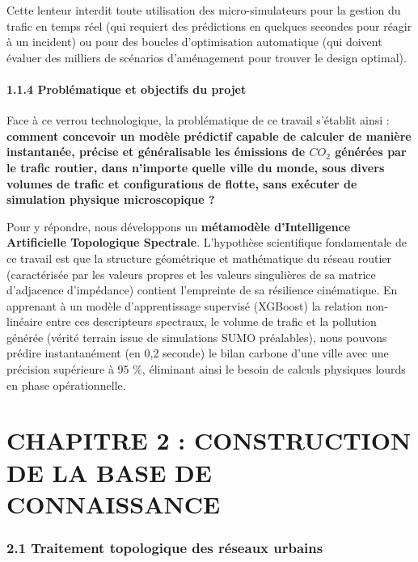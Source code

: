 \documentclass[10pt, a4paper]{article}
\begin{document}
Cette lenteur interdit toute utilisation des micro-simulateurs pour la
gestion du trafic en temps réel (qui requiert des prédictions en
quelques secondes pour réagir à un incident) ou pour des boucles
d'optimisation automatique (qui doivent évaluer des milliers de
scénarios d'aménagement pour trouver le design optimal).

\paragraph{1.1.4 Problématique et objectifs du
projet}\label{probluxe9matique-et-objectifs-du-projet}

Face à ce verrou technologique, la problématique de ce travail s'établit
ainsi : \textbf{comment concevoir un modèle prédictif capable de
calculer de manière instantanée, précise et généralisable les émissions
de \(CO_2\) générées par le trafic routier, dans n'importe quelle ville
du monde, sous divers volumes de trafic et configurations de flotte,
sans exécuter de simulation physique microscopique ?}

Pour y répondre, nous développons un \textbf{métamodèle d'Intelligence
Artificielle Topologique Spectrale}. L'hypothèse scientifique
fondamentale de ce travail est que la structure géométrique et
mathématique du réseau routier (caractérisée par les valeurs propres et
les valeurs singulières de sa matrice d'adjacence d'impédance) contient
l'empreinte de sa résilience cinématique. En apprenant à un modèle
d'apprentissage supervisé (XGBoost) la relation non-linéaire entre ces
descripteurs spectraux, le volume de trafic et la pollution générée
(vérité terrain issue de simulations SUMO préalables), nous pouvons
prédire instantanément (en 0,2 seconde) le bilan carbone d'une ville
avec une précision supérieure à 95 \%, éliminant ainsi le besoin de
calculs physiques lourds en phase opérationnelle.

\newpage

\section{CHAPITRE 2 : CONSTRUCTION DE LA BASE DE
CONNAISSANCE}\label{chapitre-2-construction-de-la-base-de-connaissance}

\subsubsection{2.1 Traitement topologique des réseaux
urbains}\label{traitement-topologique-des-ruxe9seaux-urbains}
\end{document}
